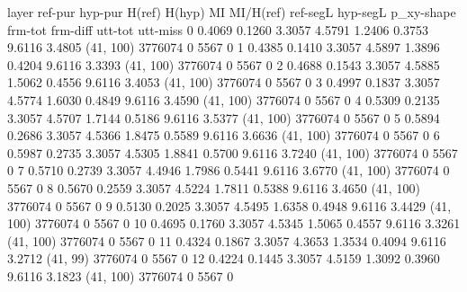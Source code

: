 layer   ref-pur    hyp-pur    H(ref)    H(hyp)      MI    MI/H(ref)    ref-segL    hyp-segL  p_xy-shape      frm-tot    frm-diff    utt-tot    utt-miss
0       0.4069     0.1260    3.3057    4.5791  1.2406       0.3753      9.6116      3.4805  (41, 100)       3776074           0       5567           0
1       0.4385     0.1410    3.3057    4.5897  1.3896       0.4204      9.6116      3.3393  (41, 100)       3776074           0       5567           0
2       0.4688     0.1543    3.3057    4.5885  1.5062       0.4556      9.6116      3.4053  (41, 100)       3776074           0       5567           0
3       0.4997     0.1837    3.3057    4.5774  1.6030       0.4849      9.6116      3.4590  (41, 100)       3776074           0       5567           0
4       0.5309     0.2135    3.3057    4.5707  1.7144       0.5186      9.6116      3.5377  (41, 100)       3776074           0       5567           0
5       0.5894     0.2686    3.3057    4.5366  1.8475       0.5589      9.6116      3.6636  (41, 100)       3776074           0       5567           0
6       0.5987     0.2735    3.3057    4.5305  1.8841       0.5700      9.6116      3.7240  (41, 100)       3776074           0       5567           0
7       0.5710     0.2739    3.3057    4.4946  1.7986       0.5441      9.6116      3.6770  (41, 100)       3776074           0       5567           0
8       0.5670     0.2559    3.3057    4.5224  1.7811       0.5388      9.6116      3.4650  (41, 100)       3776074           0       5567           0
9       0.5130     0.2025    3.3057    4.5495  1.6358       0.4948      9.6116      3.4429  (41, 100)       3776074           0       5567           0
10      0.4695     0.1760    3.3057    4.5345  1.5065       0.4557      9.6116      3.3261  (41, 100)       3776074           0       5567           0
11      0.4324     0.1867    3.3057    4.3653  1.3534       0.4094      9.6116      3.2712  (41, 99)        3776074           0       5567           0
12      0.4224     0.1445    3.3057    4.5159  1.3092       0.3960      9.6116      3.1823  (41, 100)       3776074           0       5567           0